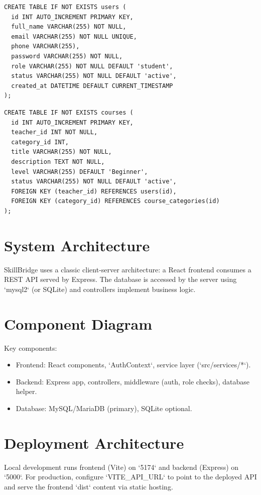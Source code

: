 \documentclass[12pt,a4paper]{report}
\begin{document}
\begin{lstlisting}[caption={Users table (excerpt)}]
CREATE TABLE IF NOT EXISTS users (
  id INT AUTO_INCREMENT PRIMARY KEY,
  full_name VARCHAR(255) NOT NULL,
  email VARCHAR(255) NOT NULL UNIQUE,
  phone VARCHAR(255),
  password VARCHAR(255) NOT NULL,
  role VARCHAR(255) NOT NULL DEFAULT 'student',
  status VARCHAR(255) NOT NULL DEFAULT 'active',
  created_at DATETIME DEFAULT CURRENT_TIMESTAMP
);
\end{lstlisting}

\begin{lstlisting}[caption={Courses table (excerpt)}]
CREATE TABLE IF NOT EXISTS courses (
  id INT AUTO_INCREMENT PRIMARY KEY,
  teacher_id INT NOT NULL,
  category_id INT,
  title VARCHAR(255) NOT NULL,
  description TEXT NOT NULL,
  level VARCHAR(255) DEFAULT 'Beginner',
  status VARCHAR(255) NOT NULL DEFAULT 'active',
  FOREIGN KEY (teacher_id) REFERENCES users(id),
  FOREIGN KEY (category_id) REFERENCES course_categories(id)
);
\end{lstlisting}

\section{System Architecture}
SkillBridge uses a classic client-server architecture: a React frontend consumes a REST API served by Express. The database is accessed by the server using `mysql2` (or SQLite) and controllers implement business logic.

\section{Component Diagram}
Key components:
\begin{itemize}
  \item Frontend: React components, `AuthContext`, service layer (`src/services/*`).
  \item Backend: Express app, controllers, middleware (auth, role checks), database helper.
  \item Database: MySQL/MariaDB (primary), SQLite optional.
\end{itemize}

\section{Deployment Architecture}
Local development runs frontend (Vite) on `5174` and backend (Express) on `5000`. For production, configure `VITE_API_URL` to point to the deployed API and serve the frontend `dist` content via static hosting.
\end{document}
